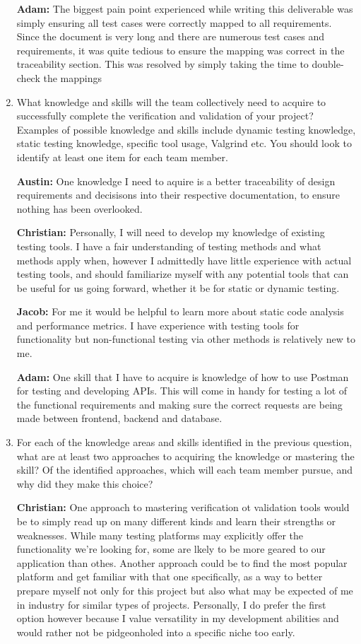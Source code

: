 \documentclass[12pt, titlepage]{article}
\begin{document}
\begin{enumerate}
  \textbf{Adam:} The biggest pain point experienced while writing this deliverable was simply ensuring all test cases were correctly mapped to all requirements. Since the document is very long and there are numerous test cases and requirements, it was quite tedious to ensure the mapping was correct in the traceability section. This was resolved by simply taking the time to double-check the mappings

  \item What knowledge and skills will the team collectively need to acquire to
  successfully complete the verification and validation of your project?
  Examples of possible knowledge and skills include dynamic testing knowledge,
  static testing knowledge, specific tool usage, Valgrind etc.  You should look to
  identify at least one item for each team member.

  \textbf{Austin:} One knowledge I need to aquire is a better traceability of design requirements and decisisons into their respective documentation, to ensure nothing has been overlooked.
  
  \textbf{Christian:} Personally, I will need to develop my knowledge of existing testing tools. I have a fair understanding of testing methods and what methods apply when, however I admittedly have little experience with actual testing tools, and should familiarize myself with any potential tools that can be useful for us going forward, whether it be for static or dynamic testing.
  
  \textbf{Jacob:} For me it would be helpful to learn more about static code analysis and performance metrics. I have experience with testing tools for functionality but non-functional testing via other methods is relatively new to me.

  \textbf{Adam:} One skill that I have to acquire is knowledge of how to use Postman for testing and developing APIs. This will come in handy for testing a lot of the functional requirements and making sure the correct requests are being made between frontend, backend and database.

  \item For each of the knowledge areas and skills identified in the previous
  question, what are at least two approaches to acquiring the knowledge or
  mastering the skill?  Of the identified approaches, which will each team
  member pursue, and why did they make this choice?

  \textbf{Christian:} One approach to mastering verification ot validation tools would be to simply read up on many different kinds and learn their strengths or weaknesses. While many testing platforms may explicitly offer the functionality we're looking for, some are lkely to be more geared to our application than othes. Another approach could be to find the most popular platform and get familiar with that one specifically, as a way to better prepare myself not only for this project but also what may be expected of me in industry for similar types of projects. Personally, I do prefer the first option however because I value versatility in my development abilities and would rather not be pidgeonholed into a specific niche too early.
  

\end{enumerate}
\end{document}
